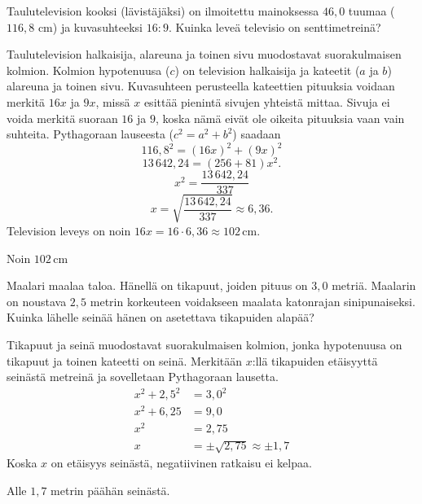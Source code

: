 \begin{esimerkki}
Taulutelevision kooksi (lävistäjäksi) on ilmoitettu mainoksessa $46,0$ tuumaa ($116,8$ cm) ja kuvasuhteeksi $16:9$. Kuinka leveä televisio on senttimetreinä?

	\begin{esimratk}
Taulutelevision halkaisija, alareuna ja toinen sivu muodostavat suorakulmaisen kolmion. Kolmion hypotenuusa ($c$) on television halkaisija ja kateetit ($a$ ja $b$) alareuna ja toinen sivu. Kuvasuhteen perusteella kateettien pituuksia voidaan merkitä $16x$ ja $9x$, missä $x$ esittää pienintä sivujen yhteistä mittaa. Sivuja ei voida merkitä suoraan $16$ ja $9$, koska nämä eivät ole oikeita pituuksia vaan vain suhteita. Pythagoraan lauseesta ($c^2 = a^2 + b^2$) saadaan
\[
116,8^2 = (16x)^2 + (9x)^2
\]
\[
13\,642,24 = (256+81)x^2.
\]
\[
x^2 = \frac{13\,642,24}{337}
\]
\[
x= \sqrt{\frac{13\,642,24}{337}} \approx 6,36.
\]
Television leveys on noin $16x = 16\cdot 6,36\approx 102$\,cm.
	\end{esimratk}
	\begin{esimvast}
	Noin $102$\,cm
	\end{esimvast}
\end{esimerkki}

\begin{esimerkki}
	Maalari maalaa taloa. Hänellä on tikapuut, joiden pituus on $3,0$ metriä. Maalarin on noustava $2,5$ metrin korkeuteen voidakseen maalata katonrajan sinipunaiseksi. Kuinka lähelle seinää hänen on asetettava tikapuiden alapää?
	\begin{esimratk}
		Tikapuut ja seinä muodostavat suorakulmaisen kolmion, jonka hypotenuusa on tikapuut ja toinen kateetti on seinä. Merkitään $x$:llä tikapuiden etäisyyttä seinästä metreinä ja sovelletaan Pythagoraan lausetta.
		\begin{align*}
		x^2 + 2,5^2 &= 3,0^2 \\
		x^2 + 6,25 &= 9,0 \\
		x^2 &= 2,75 \\
		x &= \pm \sqrt{2,75} \approx \pm 1,7
		\end{align*}
		Koska $x$ on etäisyys seinästä, negatiivinen ratkaisu ei kelpaa.
		\begin{esimvast}
		Alle $1,7$ metrin päähän seinästä. 
		\end{esimvast}
	\end{esimratk}
\end{esimerkki}

%
%

